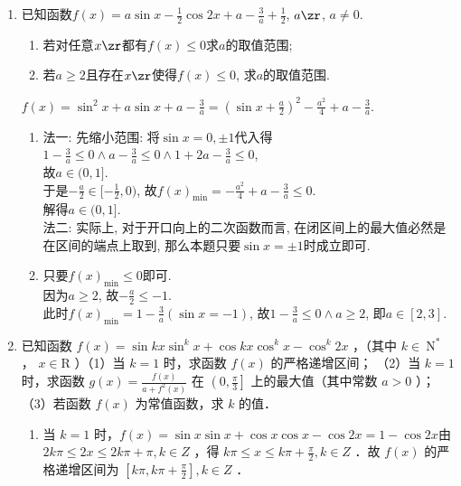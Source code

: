 \begin{enumerate}
\item 已知函数$f(x)=a\sin{x}-\frac{1}{2}\cos2x+a-\frac{3}{a}+\frac{1}{2}$, $a\zr$, $a\neq0$. 
\begin{enumerate}[(1)]
\item 若对任意$x\zr$都有$f(x)\leq 0$求$a$的取值范围; 
\item 若$a\geq 2$且存在$x\zr$使得$f(x)\leq 0$, 求$a$的取值范围. 
\end{enumerate}
\begin{jieda}
$f(x)=\sin^2x+a\sin{x}+a-\frac{3}{a}=(\sin{x}+\frac{a}{2})^2-\frac{a^2}{4}+a-\frac{3}{a}$. 
\begin{enumerate}[(1)]
\item 法一: 先缩小范围: 将$\sin{x}=0,\pm1$代入得$1-\frac{3}{a}\leq 0\land a-\frac{3}{a}\leq 0\land 1+2a-\frac{3}{a}\leq 0$, \\
故$a\in(0,1]$. \\
于是$-\frac{a}{2}\in[-\frac{1}{2},0)$, 故$f(x)_{\min}=-\frac{a^2}{4}+a-\frac{3}{a}\leq 0$. \\
解得$a\in(0,1]$. \\
法二: 实际上, 对于开口向上的二次函数而言, 在闭区间上的最大值必然是在区间的端点上取到, 那么本题只要$\sin{x}=\pm1$时成立即可. 

\item 只要$f(x)_{\min}\leq 0$即可. \\
因为$a\geq 2$, 故$-\frac{a}{2}\leq -1$. \\
此时$f(x)_{\min}=1-\frac{3}{a}(\sin{x}=-1)$, 故$1-\frac{3}{a}\leq 0\land a\geq 2$, 即$a\in[2,3]$. 
\end{enumerate}
\end{jieda}

\item 已知函数 $f(x)=\sin k x \sin ^k x+\cos k x \cos ^k x-\cos ^k 2 x$ ，（其中 $k \in \mathrm{~N}^*$ ， $x \in \mathrm{R}$ ）（1）当 $k=1$ 时，求函数 $f(x)$ 的严格递增区间；
（2）当 $k=1$ 时，求函数 $g(x)=\frac{f(x)}{a+f^2(x)}$ 在 $\left(0, \frac{\pi}{3}\right]$ 上的最大值（其中常数 $a>0$ ）； （3）若函数 $f(x)$ 为常值函数，求 $k$ 的值．
\begin{jieda}
\begin{enumerate}[(1)]
    \item 当 $k=1$ 时，$f(x)=\sin x \sin x+\cos x \cos x-\cos 2 x=1-\cos 2 x$由 $2 k \pi \leq 2 x \leq 2 k \pi+\pi, k \in Z$ ，得 $k \pi \leq x \leq k \pi+\frac{\pi}{2}, k \in Z$ ．故 $f(x)$ 的严格递增区间为 $\left[k \pi, k \pi+\frac{\pi}{2}\right], k \in Z$ ．


\end{enumerate}
\end{jieda}
\end{enumerate}
